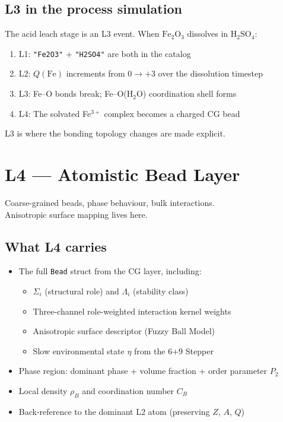 \documentclass[11pt, a4paper, oneside]{article}
\theoremstyle{definition}
\newcommand{\type}[1]{\texttt{#1}}
\begin{document}
\subsection{L3 in the process simulation}

The acid leach stage is an L3 event.  When
$\mathrm{Fe}_2\mathrm{O}_3$ dissolves in $\mathrm{H}_2\mathrm{SO}_4$:
\begin{enumerate}
  \item L1: \texttt{"Fe2O3"} + \texttt{"H2SO4"} are both in the catalog
  \item L2: $Q(\mathrm{Fe})$ increments from $0 \to +3$ over the dissolution timestep
  \item L3: Fe–O bonds break; Fe–O(H$_2$O) coordination shell forms
  \item L4: The solvated Fe$^{3+}$ complex becomes a charged CG bead
\end{enumerate}

L3 is where the bonding topology changes are made explicit.

\section{L4 — Atomistic Bead Layer}
\label{sec:l4}

\begin{tcolorbox}[colback=l4col, colframe=red!50!black,
  title={L4 — Atomistic Bead (CG)},fonttitle=\bfseries\small]
  Coarse-grained beads, phase behaviour, bulk interactions.\\
  Anisotropic surface mapping lives here.
\end{tcolorbox}

\subsection{What L4 carries}

\begin{itemize}
  \item The full \type{Bead} struct from the CG layer, including:
    \begin{itemize}
      \item $\Sigma_i$ (structural role) and $\Lambda_i$ (stability class)
      \item Three-channel role-weighted interaction kernel weights
      \item Anisotropic surface descriptor (Fuzzy Ball Model)
      \item Slow environmental state $\eta$ from the 6+9 Stepper
    \end{itemize}
  \item Phase region: dominant phase + volume fraction + order parameter $P_2$
  \item Local density $\rho_B$ and coordination number $C_B$
  \item Back-reference to the dominant L2 atom (preserving $Z$, $A$, $Q$)
\end{itemize}
\end{document}
